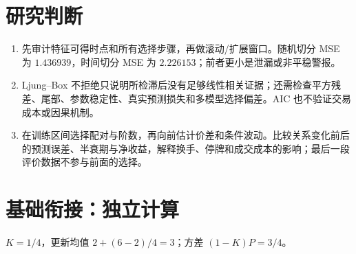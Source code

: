 \section*{研究判断}
\begin{enumerate}[leftmargin=*,start=10]
\item 先审计特征可得时点和所有选择步骤，再做滚动/扩展窗口。随机切分 MSE 为 $1.436939$，时间切分 MSE 为 $2.226153$；前者更小是泄漏或非平稳警报。
\item Ljung--Box 不拒绝只说明所检滞后没有足够线性相关证据；还需检查平方残差、尾部、参数稳定性、真实预测损失和多模型选择偏差。AIC 也不验证交易成本或因果机制。
\item 在训练区间选择配对与阶数，再向前估计价差和条件波动。比较关系变化前后的预测误差、半衰期与净收益，解释换手、停牌和成交成本的影响；最后一段评价数据不参与前面的选择。
\end{enumerate}

\section*{基础衔接：独立计算}
$K=1/4$，更新均值 $2+(6-2)/4=3$；方差 $(1-K)P=3/4$。

